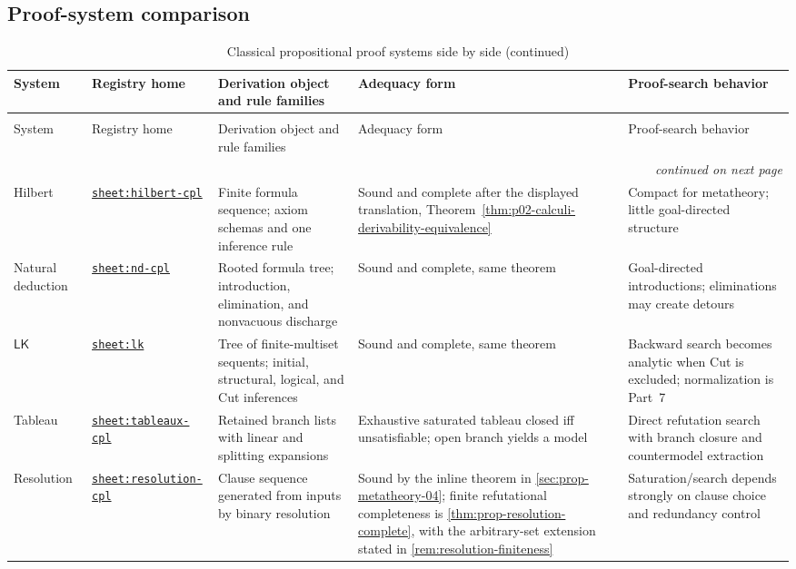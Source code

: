 \begin{landscape}
\section{Proof-system comparison}
\label{sec:p02-proof-system-comparison}

\begingroup\scriptsize\setlength{\tabcolsep}{3pt}
\begin{longtable}{@{}p{.72in}p{1.20in}p{1.80in}p{1.45in}p{1.70in}@{}}
\caption{Classical propositional proof systems side by side.}
\label{tab:p02-proof-systems}\\
\toprule
System & Registry home & Derivation object and rule families & Adequacy form & Proof-search behavior \\ \midrule
\endfirsthead
\caption[]{Classical propositional proof systems side by side (continued)}\\
\toprule
System & Registry home & Derivation object and rule families & Adequacy form & Proof-search behavior \\ \midrule
\endhead
\midrule\multicolumn{5}{r}{\emph{continued on next page}}\\
\endfoot
\endlastfoot
Hilbert & \hyperref[sheet:hilbert-cpl]{\texttt{sheet:hilbert-cpl}} & Finite formula sequence; axiom schemas and one inference rule & Sound and complete after the displayed translation, Theorem~\ref{thm:p02-calculi-derivability-equivalence} & Compact for metatheory; little goal-directed structure \\
Natural deduction & \hyperref[sheet:nd-cpl]{\texttt{sheet:nd-cpl}} & Rooted formula tree; introduction, elimination, and nonvacuous discharge & Sound and complete, same theorem & Goal-directed introductions; eliminations may create detours \\
\(\mathsf{LK}\) & \hyperref[sheet:lk]{\texttt{sheet:lk}} & Tree of finite-multiset sequents; initial, structural, logical, and Cut inferences & Sound and complete, same theorem & Backward search becomes analytic when Cut is excluded; normalization is Part~7 \\
Tableau & \hyperref[sheet:tableaux-cpl]{\texttt{sheet:tableaux-cpl}} & Retained branch lists with linear and splitting expansions & Exhaustive saturated tableau closed iff unsatisfiable; open branch yields a model & Direct refutation search with branch closure and countermodel extraction \\
Resolution & \hyperref[sheet:resolution-cpl]{\texttt{sheet:resolution-cpl}} & Clause sequence generated from inputs by binary resolution & Sound by the inline theorem in \cref{sec:prop-metatheory-04}; finite refutational completeness is \cref{thm:prop-resolution-complete}, with the arbitrary-set extension stated in \cref{rem:resolution-finiteness} & Saturation/search depends strongly on clause choice and redundancy control \\
\bottomrule
\end{longtable}
\endgroup
\end{landscape}
